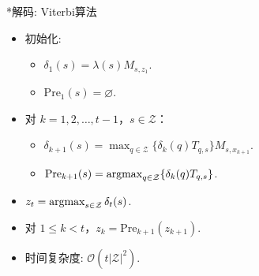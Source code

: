 \newcommand{\pre}{\mathrm{Pre}}
\begin{frame}{*解码: Viterbi算法}
\begin{itemize}
    \item 初始化:
    \begin{itemize}
        \item $\delta_1(s) = \lambda(s)M_{s,z_1}$.
        \item $\pre_1(s) = \varnothing$.
    \end{itemize}
    \item 对 $k=1, 2, \dots, t-1$，$s \in \mathcal Z$：
    \begin{itemize}
        \item $\delta_{k+1}(s) = \max_{q\in \mathcal Z}\{\delta_k(q)T_{q,s}\}M_{s,x_{k+1}}$.
        \item $\pre_{k+1}(s) = \argmax_{q\in \mathcal Z}\{\delta_k(q)T_{q,s}\}$.
    \end{itemize}
    \item $z_t = \operatorname*{argmax}_{s \in \mathcal Z}\delta_{t}(s)$.
    \item 对 $1 \le k < t$，$z_k = \pre_{k+1}(z_{k+1})$.
    \item 时间复杂度: $\mathcal O(t|\mathcal Z|^2)$.
\end{itemize}
\end{frame}
